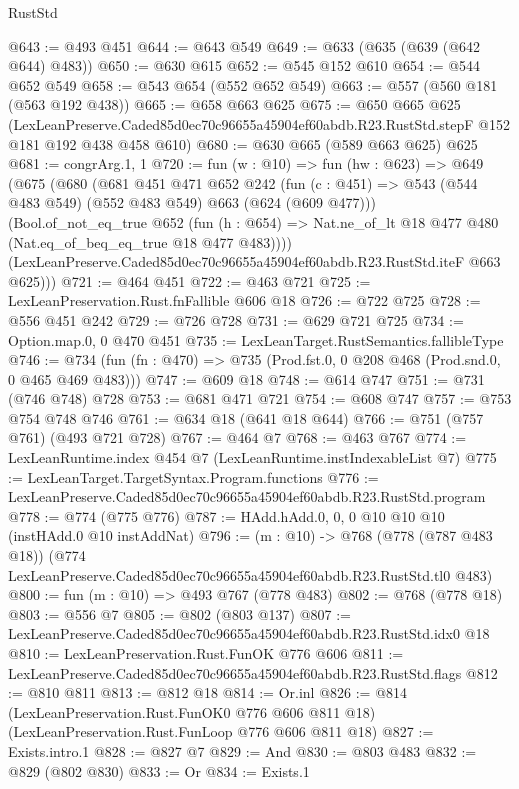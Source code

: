 \begin{lexlean}{RustStd}
\begin{coremodule}
@643 := @493 @451
@644 := @643 @549
@649 := @633 (@635 (@639 (@642 @644) @483))
@650 := @630 @615
@652 := @545 @152 @610
@654 := @544 @652 @549
@658 := @543 @654 (@552 @652 @549)
@663 := @557 (@560 @181 (@563 @192 @438))
@665 := @658 @663 @625
@675 := @650
    @665
    @625
    (LexLeanPreserve.Caded85d0ec70c96655a45904ef60abdb.R23.RustStd.stepF
      @152
      @181
      @192
      @438
      @458
      @610)
@680 := @630 @665 (@589 @663 @625) @625
@681 := congrArg.{1, 1}
@720 := fun (w : @10) =>
  fun (hw : @623) =>
  @649
    (@675
      (@680
        (@681
          @451
          @471
          @652
          @242
          (fun (c : @451) => @543 (@544 @483 @549) (@552 @483 @549) @663 (@624 (@609 @477)))
          (Bool.of_not_eq_true
            @652
            (fun (h : @654) => Nat.ne_of_lt @18 @477 @480 (Nat.eq_of_beq_eq_true @18 @477 @483))))
        (LexLeanPreserve.Caded85d0ec70c96655a45904ef60abdb.R23.RustStd.iteF @663 @625)))
@721 := @464 @451
@722 := @463 @721
@725 := LexLeanPreservation.Rust.fnFallible @606 @18
@726 := @722 @725
@728 := @556 @451 @242
@729 := @726 @728
@731 := @629 @721 @725
@734 := Option.map.{0, 0} @470 @451
@735 := LexLeanTarget.RustSemantics.fallibleType
@746 := @734 (fun (fn : @470) => @735 (Prod.fst.{0, 0} @208 @468 (Prod.snd.{0, 0} @465 @469 @483)))
@747 := @609 @18
@748 := @614 @747
@751 := @731 (@746 @748) @728
@753 := @681 @471 @721
@754 := @608 @747
@757 := @753 @754 @748 @746
@761 := @634 @18 (@641 @18 @644)
@766 := @751 (@757 @761) (@493 @721 @728)
@767 := @464 @7
@768 := @463 @767
@774 := LexLeanRuntime.index @454 @7 (LexLeanRuntime.instIndexableList @7)
@775 := LexLeanTarget.TargetSyntax.Program.functions
@776 := LexLeanPreserve.Caded85d0ec70c96655a45904ef60abdb.R23.RustStd.program
@778 := @774 (@775 @776)
@787 := HAdd.hAdd.{0, 0, 0} @10 @10 @10 (instHAdd.{0} @10 instAddNat)
@796 := (m : @10) ->
  @768
    (@778 (@787 @483 @18))
    (@774 LexLeanPreserve.Caded85d0ec70c96655a45904ef60abdb.R23.RustStd.tl0 @483)
@800 := fun (m : @10) => @493 @767 (@778 @483)
@802 := @768 (@778 @18)
@803 := @556 @7
@805 := @802 (@803 @137)
@807 := LexLeanPreserve.Caded85d0ec70c96655a45904ef60abdb.R23.RustStd.idx0 @18
@810 := LexLeanPreservation.Rust.FunOK @776 @606
@811 := LexLeanPreserve.Caded85d0ec70c96655a45904ef60abdb.R23.RustStd.flags
@812 := @810 @811
@813 := @812 @18
@814 := Or.inl
@826 := @814
    (LexLeanPreservation.Rust.FunOK0 @776 @606 @811 @18)
    (LexLeanPreservation.Rust.FunLoop @776 @606 @811 @18)
@827 := Exists.intro.{1}
@828 := @827 @7
@829 := And
@830 := @803 @483
@832 := @829 (@802 @830)
@833 := Or
@834 := Exists.{1}

\end{coremodule}
\end{lexlean}

